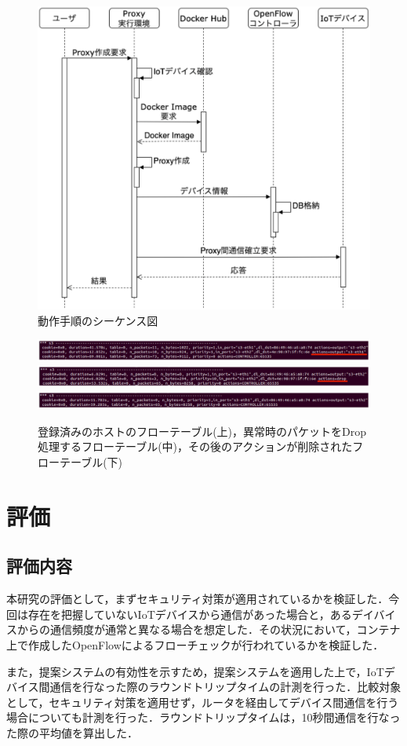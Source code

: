 \documentclass[Japanese]{dicomopapers}
\begin{document}
\begin{figure}[!tb]
	\centering
	\includegraphics[width=\linewidth]{img/seaquence.eps}
	\caption{動作手順のシーケンス図}
	\label{fig:seaquence}
\end{figure}

\begin{figure}[!tb]
	\centering
	\includegraphics[width=\linewidth]{img/result_flow4v3.eps}
	\includegraphics[width=\linewidth]{img/result_flow2v3.eps}
	\includegraphics[width=\linewidth]{img/result_flow3v2.eps}
	\caption{登録済みのホストのフローテーブル(上)，異常時のパケットをDrop処理するフローテーブル(中)，その後のアクションが削除されたフローテーブル(下)}
	\label{fig:result1}
\end{figure}

\section{評価}
\subsection{評価内容}
本研究の評価として，まずセキュリティ対策が適用されているかを検証した．今回は存在を把握していないIoTデバイスから通信があった場合と，あるデイバイスからの通信頻度が通常と異なる場合を想定した．その状況において，コンテナ上で作成したOpenFlowによるフローチェックが行われているかを検証した．\par
また，提案システムの有効性を示すため，提案システムを適用した上で，IoTデバイス間通信を行なった際のラウンドトリップタイムの計測を行った．比較対象として，セキュリティ対策を適用せず，ルータを経由してデバイス間通信を行う場合についても計測を行った．ラウンドトリップタイムは，10秒間通信を行なった際の平均値を算出した．
\end{document}
